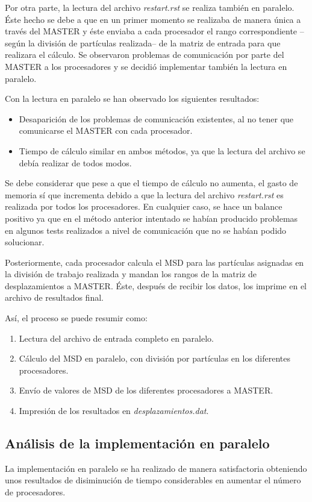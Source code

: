 \documentclass[onecolumn]{article}
\renewcommand{\it}[1]{\textit{#1}}
\begin{document}
Por otra parte, la lectura del archivo \it{restart.rst} se realiza también en paralelo. Éste hecho se debe a que en un primer momento se realizaba de manera única a través del MASTER y éste enviaba a cada procesador el rango correspondiente --según la división de partículas realizada-- de la matriz de entrada para que realizara el cálculo. Se observaron problemas de comunicación por parte del MASTER a los procesadores y se decidió implementar también la lectura en paralelo.

Con la lectura en paralelo se han observado los siguientes resultados:
\begin{itemize}
\item Desaparición de los problemas de comunicación existentes, al no tener que comunicarse el MASTER con cada procesador.
\item Tiempo de cálculo similar en ambos métodos, ya que la lectura del archivo se debía realizar de todos modos.
\end{itemize}
Se debe considerar que pese a que el tiempo de cálculo no aumenta, el gasto de memoria sí que incrementa debido a que la lectura del archivo \it{restart.rst} es realizada por todos los procesadores. En cualquier caso, se hace un balance positivo ya que en el método anterior intentado se habían producido problemas en algunos tests realizados a nivel de comunicación que no se habían podido solucionar.

Posteriormente, cada procesador calcula el MSD para las partículas asignadas en la división de trabajo realizada y mandan los rangos de la matriz de desplazamientos a MASTER. Éste, después de recibir los datos, los imprime en el archivo de resultados final.

Así, el proceso se puede resumir como:
\begin{enumerate}
\item Lectura del archivo de entrada completo en paralelo.
\item Cálculo del MSD en paralelo, con división por partículas en los diferentes procesadores.
\item Envío de valores de MSD de los diferentes procesadores a MASTER.
\item Impresión de los resultados en \it{desplazamientos.dat}.
\end{enumerate}

\subsection{Análisis de la implementación en paralelo}
La implementación en paralelo se ha realizado de manera satisfactoria obteniendo unos resultados de disiminución de tiempo considerables en aumentar el número de procesadores.
\end{document}
